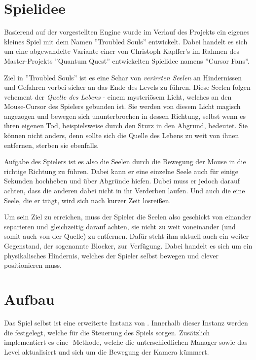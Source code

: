 \chapter{Spielidee}

Basierend auf der vorgestellten Engine wurde im Verlauf des Projekts ein eigenes kleines Spiel mit dem Namen ''Troubled Souls'' entwickelt. Dabei handelt es sich um eine abgewandelte Variante einer von Christoph Kapffer's im Rahmen des Master-Projekts ''Quantum Quest'' entwickelten Spielidee namens ''Cursor Fans''. 

Ziel in ''Troubled Souls'' ist es eine Schar von \textit{verirrten Seelen} an Hindernissen und Gefahren vorbei sicher an das Ende des Levels zu führen. Diese Seelen folgen vehement der \textit{Quelle des Lebens} - einem mysteriösem Licht, welches an den Mouse-Cursor des Spielers gebunden ist. Sie werden von diesem Licht magisch angezogen und bewegen sich ununterbrochen in dessen Richtung, selbst wenn es ihren eigenen Tod, beispielsweise durch den Sturz in den Abgrund, bedeutet. Sie können nicht anders, denn sollte sich die Quelle des Lebens zu weit von ihnen entfernen, sterben sie ebenfalls.

Aufgabe des Spielers ist es also die Seelen durch die Bewegung der Mouse in die richtige Richtung zu führen. Dabei kann er eine einzelne Seele auch für einige Sekunden hochheben und über Abgründe hiefen. Dabei muss er jedoch darauf achten, dass die anderen dabei nicht in ihr Verderben laufen. Und auch die eine Seele, die er trägt, wird sich nach kurzer Zeit losreißen. 

Um sein Ziel zu erreichen, muss der Spieler die Seelen also geschickt von einander separieren und gleichzeitig darauf achten, sie nicht zu weit voneinander (und somit auch von der Quelle) zu entfernen. Dafür steht ihm aktuell auch ein weiter Gegenstand, der sogenannte Blocker, zur Verfügung. Dabei handelt es sich um ein physikalisches Hindernis, welches der Spieler selbst bewegen und clever positionieren muss.


\chapter{Aufbau}

Das Spiel selbst ist eine erweiterte Instanz von . Innerhalb dieser Instanz werden die  festgelegt, welche für die Steuerung des Spiels sorgen. Zusätzlich implementiert es eine -Methode, welche die unterschiedlichen Manager sowie das Level aktualisiert und sich um die Bewegung der Kamera kümmert.


